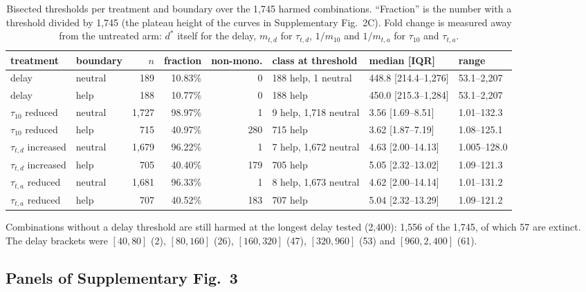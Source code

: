 \documentclass[11pt]{article}
\begin{document}
\begin{table}[H]
\centering
\caption{Bisected thresholds per treatment and boundary over the 1,745 harmed
combinations. ``Fraction'' is the number with a threshold divided by 1,745 (the
plateau height of the curves in Supplementary Fig.~2C). Fold change is measured away from the
untreated arm: $d^\ast$ itself for the delay, $m_{t,d}$ for $\tau_{t,d}$, $1/m_{10}$ and
$1/m_{t,a}$ for $\tau_{10}$ and $\tau_{t,a}$.}
\label{tab:harm_thr}
\footnotesize
\setlength{\tabcolsep}{3pt}
\begin{tabular}{llrrrlll}
\toprule
treatment & boundary & $n$ & fraction & non-mono. & class at threshold & median [IQR] & range \\
\midrule
delay & neutral & 189 & 10.83\% & 0 & 188 help, 1 neutral & 448.8 [214.4--1{,}276] & 53.1--2{,}207 \\
delay & help & 188 & 10.77\% & 0 & 188 help & 450.0 [215.3--1{,}284] & 53.1--2{,}207 \\
$\tau_{10}$ reduced & neutral & 1{,}727 & 98.97\% & 1 & 9 help, 1{,}718 neutral & 3.56 [1.69--8.51] & 1.01--132.3 \\
$\tau_{10}$ reduced & help & 715 & 40.97\% & 280 & 715 help & 3.62 [1.87--7.19] & 1.08--125.1 \\
$\tau_{t,d}$ increased & neutral & 1{,}679 & 96.22\% & 1 & 7 help, 1{,}672 neutral & 4.63 [2.00--14.13] & 1.005--128.0 \\
$\tau_{t,d}$ increased & help & 705 & 40.40\% & 179 & 705 help & 5.05 [2.32--13.02] & 1.09--121.3 \\
$\tau_{t,a}$ reduced & neutral & 1{,}681 & 96.33\% & 1 & 8 help, 1{,}673 neutral & 4.62 [2.00--14.14] & 1.01--131.2 \\
$\tau_{t,a}$ reduced & help & 707 & 40.52\% & 183 & 707 help & 5.04 [2.32--13.29] & 1.09--121.2 \\
\bottomrule
\end{tabular}
\end{table}

Combinations without a delay threshold are still harmed at the longest delay
tested (2,400): 1,556 of the 1,745, of which 57 are extinct. The delay brackets
were $[40,80]$ (2), $[80,160]$ (26), $[160,320]$ (47), $[320,960]$ (53) and
$[960, 2{,}400]$ (61).

\subsection{Panels of Supplementary Fig.~3}
\end{document}
